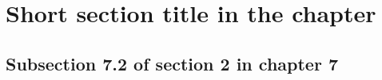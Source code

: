 \clearpage{} %
\section[Long section title displayed in the table of content]{Short section title in the chapter}
\lipsum[11-19]

\subsection{Subsection 7.2 of section 2 in chapter 7}
\lipsum[13-14]


{}
\specialsection %
\headerspecialsection

{\hypersetup{urlcolor=ntnu,linkcolor=sophia} %


}


\vspace{2.81ex}

\begin{center}
    {\color{sophia} \Huge
    }
\end{center}